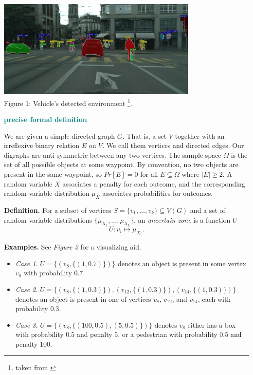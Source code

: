 \begin{center}
  \includegraphics[width=0.75\textwidth]{images/sensor.png} \\
  Figure 1:  Vehicle's detected environment \footnote{taken from \cite{sensor}}.
\end{center}

\textcolor{teal}{\textbf{precise formal definition}}

We are given a simple directed graph $G$. That is, a set $V$ together with an irreflexive binary relation $E$ on $V$. We call them vertices and directed edges. Our digraphs are anti-symmetric between any two vertices. The sample space $\Omega$ is the set of all possible objects at some waypoint. By convention, no two objects are present in the same waypoint, so $Pr[E] = 0$ for all $E \subseteq \Omega$ where $|E| \geq 2$. A random variable $X$ associates a penalty for each outcome, and the corresponding random variable distribution $\mu_X$ associates probabilities for outcomes.

\textbf{Definition.} For a subset of vertices $S = \{ v_1, \dots, v_k \} \subseteq V(G)$ and a set of random variable distributions $\{ \mu_{X_1}, \dots, \mu_{X_k} \}$, an \textit{uncertain zone} is a function $U$
$$
U: v_i \mapsto \mu_{X_i}.
$$

\textbf{Examples.} See \textit{Figure 2} for a visualizing aid.
\begin{itemize}
    \item \textit{Case 1.} $U = \{ (v_8, \{(1, 0.7)\} ) \}$ denotes an object is present in some vertex $v_8$ with probability $0.7$.
    \item \textit{Case 2.} $U = \{ (v_8, \{(1, 0.3)\}), (v_{12}, \{(1, 0.3)\}), (v_{14}, \{(1, 0.3)\}) \}$ denotes an object is present in one of vertices $v_8$, $v_{12}$, and $v_{14}$, each with probability $0.3$.
    \item \textit{Case 3.} $U = \{ (v_8, \{ (100, 0.5), (5, 0.5) \} ) \}$ denotes $v_8$ either has a box with probability $0.5$ and penalty $5$, or a pedestrian with probability $0.5$ and penalty $100$.
\end{itemize}

